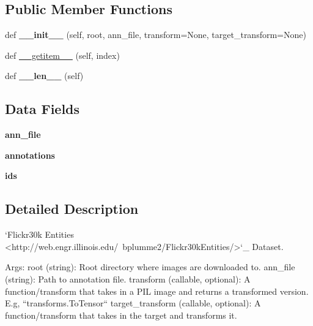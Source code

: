 \subsection*{Public Member Functions}
\begin{DoxyCompactItemize}
\item 
\mbox{\label{classtorchvision_1_1datasets_1_1flickr_1_1Flickr30k_a1a4ff88de7b8fbe7518418d1bedd7584}} 
def {\bfseries \+\_\+\+\_\+init\+\_\+\+\_\+} (self, root, ann\+\_\+file, transform=None, target\+\_\+transform=None)
\item 
def \hyperlink{classtorchvision_1_1datasets_1_1flickr_1_1Flickr30k_a869522ad69d0e5b5ba82a289d28f8477}{\+\_\+\+\_\+getitem\+\_\+\+\_\+} (self, index)
\item 
\mbox{\label{classtorchvision_1_1datasets_1_1flickr_1_1Flickr30k_a5b9fc6178a45948da8b694d83322e950}} 
def {\bfseries \+\_\+\+\_\+len\+\_\+\+\_\+} (self)
\end{DoxyCompactItemize}
\subsection*{Data Fields}
\begin{DoxyCompactItemize}
\item 
\mbox{\label{classtorchvision_1_1datasets_1_1flickr_1_1Flickr30k_a775ff9a872c26e9ce4dac85d45c1b3e2}} 
{\bfseries ann\+\_\+file}
\item 
\mbox{\label{classtorchvision_1_1datasets_1_1flickr_1_1Flickr30k_a51c965c5cd9b228a4cd2bc957dbe4764}} 
{\bfseries annotations}
\item 
\mbox{\label{classtorchvision_1_1datasets_1_1flickr_1_1Flickr30k_ac9324db4b3758d0b2438b8499bde828e}} 
{\bfseries ids}
\end{DoxyCompactItemize}


\subsection{Detailed Description}
\begin{DoxyVerb}`Flickr30k Entities <http://web.engr.illinois.edu/~bplumme2/Flickr30kEntities/>`_ Dataset.

Args:
    root (string): Root directory where images are downloaded to.
    ann_file (string): Path to annotation file.
    transform (callable, optional): A function/transform that takes in a PIL image
        and returns a transformed version. E.g, ``transforms.ToTensor``
    target_transform (callable, optional): A function/transform that takes in the
        target and transforms it.
\end{DoxyVerb}
 

